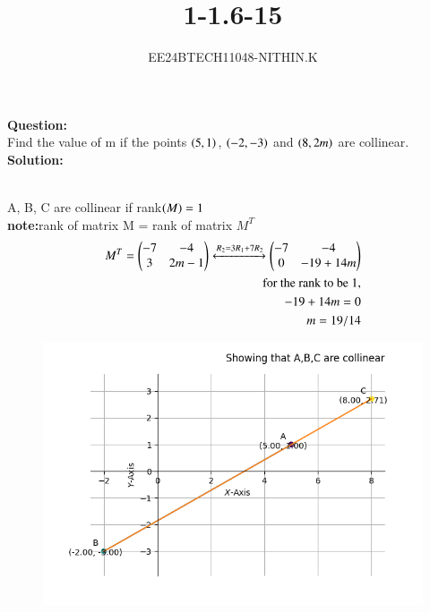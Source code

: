\documentclass[journal]{IEEEtran}
\numberwithin{equation}{enumi}
\numberwithin{figure}{enumi}
\begin{document}


\title{1-1.6-15}
\author{EE24BTECH11048-NITHIN.K}
{\let\newpage\relax\maketitle}

\textbf{Question:} \\
Find the value of m if the points $\left(5, 1\right)$, $\left(-2, -3\right)$ and $\left(8, 2m\right)$ are collinear. \\
\textbf{Solution:} \\
\begin{table}[h!]    
      \centering
      
      \caption{}
\end{table} \\
A, B, C are collinear if rank$\left(M\right) = 1$ \\
\textbf{note:}rank of matrix M = rank of matrix $M^T$ \\
\begin{align}
	M^T = \begin{pmatrix}
		-7 & -4 \\
		3 & 2m-1\end{pmatrix}
	\xleftrightarrow{\substack{R_2 = 3R_1 + 7R_2}}
	\begin{pmatrix}
		-7 & -4 \\
		0 & -19+14m\end{pmatrix} \\
	\text{for the rank to be 1,} \\
	-19+14m=0 \\
	m=19/14
\end{align}
\begin{figure}[h]
\centering
\includegraphics[width=0.7\linewidth]{figs/Figure_1.png}
\caption{}
\label{graph}
\end{figure}
\end{document}
